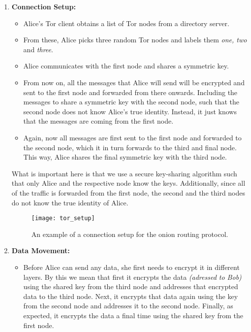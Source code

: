 \begin{enumerate}
  \item \textbf{Connection Setup:}
    \begin{itemize}
      \item Alice's Tor client obtains a list of Tor nodes from a directory server.
      \item From these, Alice picks three random Tor nodes and labels them \textit{one, two} and \textit{three}.
      \item Alice communicates with the first node and shares a symmetric key.
      \item From now on, all the messages that Alice will send will be encrypted and sent to the first node and forwarded from there onwards.
        Including the messages to share a symmetric key with the second node, such that the second node does not know Alice's true identity.
        Instead, it just knows that the messages are coming from the first node.
      \item Again, now all messages are first sent to the first node and forwarded to the second node, which it in turn forwards to the third and final node.
        This way, Alice shares the final symmetric key with the third node.
    \end{itemize}

    What is important here is that we use a secure key-sharing algorithm such that only Alice and the respective node know the keys.
    Additionally, since all of the traffic is forwarded from the first node, the second and the third nodes do not know the true identity of Alice.

    \begin{figure}[ht]
      \centering
      \texttt{[image: tor\_setup]}
      \caption{An example of a connection setup for the onion routing protocol.}
      \label{fig:tor_setup}
    \end{figure}

  \newpage

  \item \textbf{Data Movement:}
    \begin{itemize}
      \item Before Alice can send any data, she first needs to encrypt it in different layers. By this we mean that first it encrypts the data \textit{(adressed to Bob)}
        using the shared key from the third node and addresses that encrypted data to the third node.
        Next, it encrypts that data again using the key from the second node and addresses it to the second node.
        Finally, as expected, it encrypts the data a final time using the shared key from the first node.


\end{itemize}
\end{enumerate}
